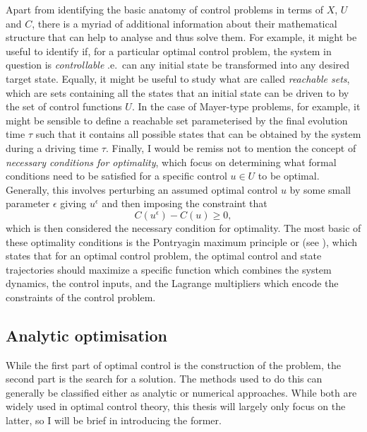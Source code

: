 Apart from identifying the basic anatomy of control problems in terms of $X$, $U$ and $C$, there is a myriad of additional information about their mathematical structure that can help to analyse and thus solve them. For example, it might be useful to identify if, for a particular optimal control problem, the system in question is \emph{controllable}\cite{dirr_lie_2008, fleming_optimal_1975} \@i.e.~can any initial state be transformed into any desired target state. Equally, it might be useful to study what are called \emph{reachable sets}\cite{vom_ende_reachability_2020, fleming_optimal_1975}, which are sets containing all the states that an initial state can be driven to by the set of control functions $U$. In the case of Mayer-type problems, for example, it might be sensible to define a reachable set parameterised by the final evolution time $\tau$ such that it contains all possible states that can be obtained by the system during a driving time $\tau$. Finally, I would be remiss not to mention the concept of \emph{necessary conditions for optimality}\cite{mangasarian_sufficient_1966}, which focus on determining what formal conditions need to be satisfied for a specific control $u \in U$ to be optimal. Generally, this involves perturbing an assumed optimal control $u$ by some small parameter $\epsilon$ giving $u^{\epsilon}$ and then imposing the constraint that
\begin{equation}\label{eq:optimality_condition}
    C(u^{\epsilon}) - C(u) \geq 0,
\end{equation}
which is then considered the necessary condition for optimality. The most basic of these optimality conditions is the Pontryagin maximum principle or  \cite{boltyanski_nonclassical_1999} (see ), which states that for an optimal control problem, the optimal control and state trajectories should maximize a specific function which combines the system dynamics, the control inputs, and the Lagrange multipliers which encode the constraints of the control problem.

\subsection{Analytic optimisation}

While the first part of optimal control is the construction of the problem, the second part is the search for a solution. The methods used to do this can generally be classified either as analytic or numerical approaches. While both are widely used in optimal control theory, this thesis will largely only focus on the latter, so I will be brief in introducing the former. 

